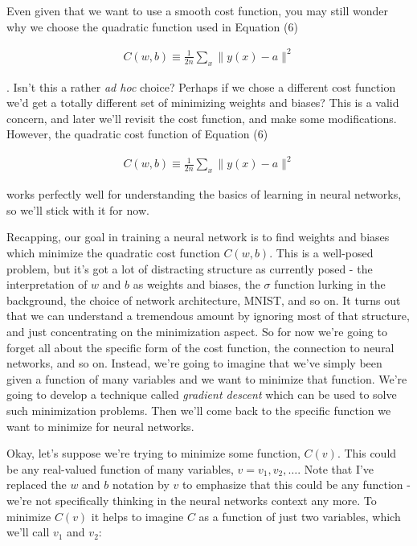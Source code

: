 Even given that we want to use a smooth cost function, you may still wonder why we choose the quadratic function used in Equation (6)

\begin{align*}
C(w,b) \equiv \frac{1}{2n} \sum_x \| y(x) - a\|^2 \nonumber
\end{align*}

\noindent. Isn't this a rather \emph{ad hoc} choice? Perhaps if we chose a different cost function we'd get a totally different set of minimizing weights and biases? This is a valid concern, and later we'll revisit the cost function, and make some modifications. However, the quadratic cost function of Equation (6)

\begin{align*}
C(w,b) \equiv \frac{1}{2n} \sum_x \| y(x) - a\|^2 \nonumber
\end{align*}

\noindent works perfectly well for understanding the basics of learning in neural networks, so we'll stick with it for now.


Recapping, our goal in training a neural network is to find weights and biases which minimize the quadratic cost function $C(w, b)$. This is a well-posed problem, but it's got a lot of distracting structure as currently posed - the interpretation of $w$ and $b$ as weights and biases, the $\sigma$ function lurking in the background, the choice of network architecture, MNIST, and so on. It turns out that we can understand a tremendous amount by ignoring most of that structure, and just concentrating on the minimization aspect. So for now we're going to forget all about the specific form of the cost function, the connection to neural networks, and so on. Instead, we're going to imagine that we've simply been given a function of many variables and we want to minimize that function. We're going to develop a technique called \emph{gradient descent} which can be used to solve such minimization problems. Then we'll come back to the specific function we want to minimize for neural networks.


Okay, let's suppose we're trying to minimize some function, $C(v)$. This could be any real-valued function of many variables, $v = v_1, v_2, \ldots$. Note that I've replaced the $w$ and $b$ notation by $v$ to emphasize that this could be any function - we're not specifically thinking in the neural networks context any more. To minimize $C(v)$ it helps to imagine $C$ as a function of just two variables, which we'll call $v_1$ and $v_2$:

